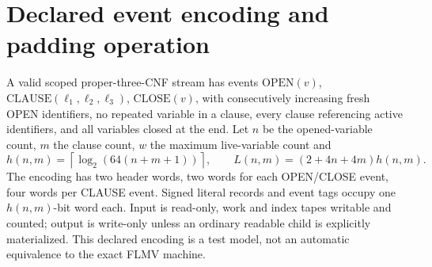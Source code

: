 \documentclass[11pt]{article}
\begin{document}
\section{Declared event encoding and padding operation}
A valid scoped proper-three-CNF stream has events
$\mathrm{OPEN}(v)$, $\mathrm{CLAUSE}(\ell_1,\ell_2,\ell_3)$,
$\mathrm{CLOSE}(v)$, with consecutively increasing fresh
OPEN identifiers, no repeated variable in a clause, every clause
referencing active identifiers, and all variables closed at the
end. Let $n$ be the opened-variable count, $m$ the clause count,
$w$ the maximum live-variable count and
\[
 h(n,m)=\left\lceil\log_2(64(n+m+1))\right\rceil,\qquad
 L(n,m)=(2+4n+4m)h(n,m).
 \tag{1}
\]
The encoding has two header words, two words for each OPEN/CLOSE
event, four words per CLAUSE event. Signed literal records and
event tags occupy one $h(n,m)$-bit word each. Input is read-only,
work and index tapes writable and counted; output is write-only
unless an ordinary readable child is explicitly materialized.
This declared encoding is a test model, not an automatic equivalence
to the exact FLMV machine.
\end{document}
